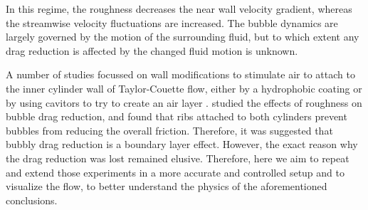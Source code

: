 \documentclass{jfm}
\begin{document}
In this regime, the roughness decreases the near wall velocity gradient, whereas the streamwise velocity fluctuations are increased. The bubble dynamics are largely governed by the motion of the surrounding fluid, but to which extent any drag reduction is affected by the changed fluid motion is  unknown.

A number of studies focussed on wall modifications to stimulate air to attach to the inner cylinder wall of Taylor-Couette flow, either by a hydrophobic coating \citep{sri15} or by using cavitors to try to create an air layer \citep{ver18}.    \citet{ber07} studied the effects of roughness on bubble drag reduction, and found that ribs attached to both cylinders prevent bubbles from reducing the overall friction. Therefore, it was suggested that bubbly drag reduction is a boundary layer effect. However, the exact reason why the drag reduction was lost remained elusive. Therefore,  here we aim to repeat and extend those experiments in a more accurate and controlled setup and to visualize the flow, to better understand the physics of the aforementioned conclusions.
\end{document}
